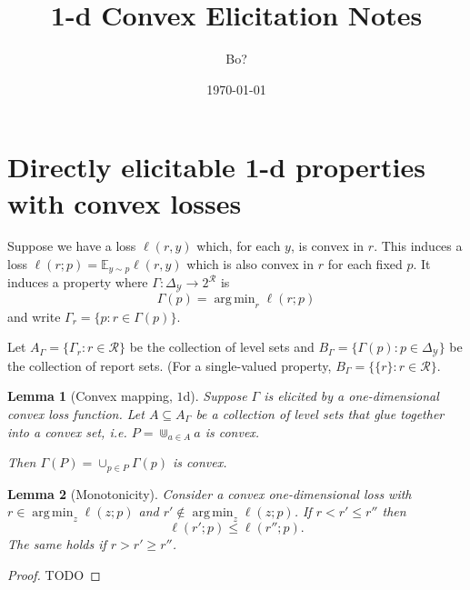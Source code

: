 \documentclass[12pt]{article}
\title{1-d Convex Elicitation Notes}
\author{Bo?}
\date{\today}
\newcommand{\E}{\mathbb{E}}
\newcommand{\R}{\mathcal{R}}
\newcommand{\Y}{\mathcal{Y}}
\DeclareMathOperator*{\argmin}{arg\,min}
\newtheorem{lemma}{Lemma}
\theoremstyle{definition}
\begin{document}
\maketitle

\section{Directly elicitable 1-d properties with convex losses}

Suppose we have a loss $\ell(r,y)$ which, for each $y$, is convex in $r$.
This induces a loss $\ell(r;p) = \E_{y\sim p} \ell(r,y)$ which is also convex in $r$ for each fixed $p$.
It induces a property where $\Gamma: \Delta_{\Y} \to 2^{\R}$ is
  \[ \Gamma(p) = \argmin_r \ell(r;p) \]
and write $\Gamma_r = \{p : r \in \Gamma(p) \}$.

Let $A_{\Gamma} = \{\Gamma_r : r \in \R\}$ be the collection of level sets and $B_{\Gamma} = \{\Gamma(p) : p \in \Delta_{\Y}\}$ be the collection of report sets. (For a single-valued property, $B_{\Gamma} = \{\{r\} : r \in \R\}$.

%
\begin{lemma}[Convex mapping, $1$d] \label{lemma:convex-map}
  Suppose $\Gamma$ is elicited by a one-dimensional convex loss function.
  Let $A \subseteq A_{\Gamma}$ be a collection of level sets that glue together into a convex set, i.e. $P = \Cup_{a \in A} a$ is convex.

  Then $\Gamma(P) = \cup_{p \in P} \Gamma(p)$ is convex.
\end{lemma}

\begin{lemma}[Monotonicity] \label{lemma:monot}
  Consider a convex one-dimensional loss with $r \in \argmin_{z} \ell(z;p)$ and $r' \not\in \argmin_z \ell(z;p)$.
  If $r < r' \leq r''$ then
    \[ \ell(r';p) \leq \ell(r'';p) . \]
  The same holds if $r > r' \geq r''$.
\end{lemma}
\begin{proof}
  TODO
\end{proof}
\end{document}
